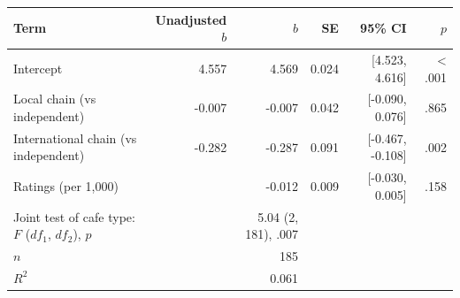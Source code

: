 \begin{tabular}{lrrrrr}
\toprule
Term & Unadjusted $b$ & $b$ & SE & 95\% CI & $p$ \\
\midrule
Intercept & 4.557 & 4.569 & 0.024 & [4.523, 4.616] & \textless{} .001 \\
Local chain (vs independent) & -0.007 & -0.007 & 0.042 & [-0.090, 0.076] & .865 \\
International chain (vs independent) & -0.282 & -0.287 & 0.091 & [-0.467, -0.108] & .002 \\
Ratings (per 1,000) &  & -0.012 & 0.009 & [-0.030, 0.005] & .158 \\
Joint test of cafe type: $F$ ($df_1$, $df_2$), $p$ &  & 5.04 (2, 181), .007 &  &  &  \\
$n$ &  & 185 &  &  &  \\
$R^2$ &  & 0.061 &  &  &  \\
\bottomrule
\end{tabular}
